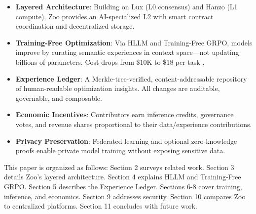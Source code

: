 \begin{itemize}[leftmargin=*]
\item \textbf{Layered Architecture}: Building on Lux (L0 consensus) and Hanzo (L1 compute), Zoo provides an AI-specialized L2 with smart contract coordination and decentralized storage.
\item \textbf{Training-Free Optimization}: Via HLLM and Training-Free GRPO, models improve by curating semantic experiences in context space—not updating billions of parameters. Cost drops from \$10K to \$18 per task \cite{tencent2025grpo}.
\item \textbf{Experience Ledger}: A Merkle-tree-verified, content-addressable repository of human-readable optimization insights. All changes are auditable, governable, and composable.
\item \textbf{Economic Incentives}: Contributors earn inference credits, governance votes, and revenue shares proportional to their data/experience contributions.
\item \textbf{Privacy Preservation}: Federated learning and optional zero-knowledge proofs enable private model training without exposing sensitive data.
\end{itemize}

This paper is organized as follows: Section 2 surveys related work. Section 3 details Zoo's layered architecture. Section 4 explains HLLM and Training-Free GRPO. Section 5 describes the Experience Ledger. Sections 6-8 cover training, inference, and economics. Section 9 addresses security. Section 10 compares Zoo to centralized platforms. Section 11 concludes with future work.

